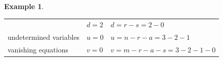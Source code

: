 \documentclass[]{book}
\theoremstyle{definition}
\theoremstyle{definition}
\newtheorem{example}{Example}[chapter]
\theoremstyle{definition}
\theoremstyle{definition}
\theoremstyle{remark}
\begin{document}
\begin{example}
\begin{longtable}[]{@{}lll@{}}
\begin{minipage}[t]{0.20\columnwidth}
\end{minipage} & \begin{minipage}[t]{0.24\columnwidth}\raggedright
\(d=2\)\strut
\end{minipage} & \begin{minipage}[t]{0.47\columnwidth}\raggedright
\(d=r-s=2-0\)\strut
\end{minipage}\tabularnewline
\begin{minipage}[t]{0.20\columnwidth}\raggedright
undetermined variables\strut
\end{minipage} & \begin{minipage}[t]{0.24\columnwidth}\raggedright
\(u=0\)\strut
\end{minipage} & \begin{minipage}[t]{0.47\columnwidth}\raggedright
\(u=n-r-a=3-2-1\)\strut
\end{minipage}\tabularnewline
\begin{minipage}[t]{0.20\columnwidth}\raggedright
vanishing equations\strut
\end{minipage} & \begin{minipage}[t]{0.24\columnwidth}\raggedright
\(v=0\)\strut
\end{minipage} & \begin{minipage}[t]{0.47\columnwidth}\raggedright
\(v=m-r-a-s=3-2-1-0\)\strut
\end{minipage}\tabularnewline
\bottomrule
\end{longtable}
\end{example}
\end{document}

